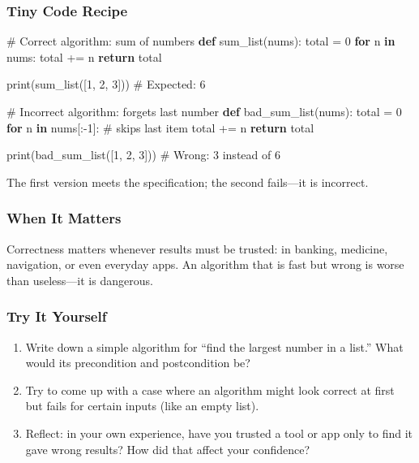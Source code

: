 \documentclass[
  letterpaper,
  DIV=11,
  numbers=noendperiod]{scrreprt}
\newenvironment{Shaded}{\begin{snugshade}}{\end{snugshade}}
\newcommand{\BuiltInTok}[1]{\textcolor[rgb]{0.00,0.23,0.31}{#1}}
\newcommand{\CommentTok}[1]{\textcolor[rgb]{0.37,0.37,0.37}{#1}}
\newcommand{\ControlFlowTok}[1]{\textcolor[rgb]{0.00,0.23,0.31}{\textbf{#1}}}
\newcommand{\DecValTok}[1]{\textcolor[rgb]{0.68,0.00,0.00}{#1}}
\newcommand{\KeywordTok}[1]{\textcolor[rgb]{0.00,0.23,0.31}{\textbf{#1}}}
\newcommand{\NormalTok}[1]{\textcolor[rgb]{0.00,0.23,0.31}{#1}}
\newcommand{\OperatorTok}[1]{\textcolor[rgb]{0.37,0.37,0.37}{#1}}
\providecommand{\tightlist}{%
  \setlength{\itemsep}{0pt}\setlength{\parskip}{0pt}}
\begin{document}
\subsubsection{Tiny Code Recipe}\label{tiny-code-recipe-58}

\begin{Shaded}
\begin{Highlighting}[]
\CommentTok{\# Correct algorithm: sum of numbers}
\KeywordTok{def}\NormalTok{ sum\_list(nums):}
\NormalTok{    total }\OperatorTok{=} \DecValTok{0}
    \ControlFlowTok{for}\NormalTok{ n }\KeywordTok{in}\NormalTok{ nums:}
\NormalTok{        total }\OperatorTok{+=}\NormalTok{ n}
    \ControlFlowTok{return}\NormalTok{ total}

\BuiltInTok{print}\NormalTok{(sum\_list([}\DecValTok{1}\NormalTok{, }\DecValTok{2}\NormalTok{, }\DecValTok{3}\NormalTok{]))  }\CommentTok{\# Expected: 6}

\CommentTok{\# Incorrect algorithm: forgets last number}
\KeywordTok{def}\NormalTok{ bad\_sum\_list(nums):}
\NormalTok{    total }\OperatorTok{=} \DecValTok{0}
    \ControlFlowTok{for}\NormalTok{ n }\KeywordTok{in}\NormalTok{ nums[:}\OperatorTok{{-}}\DecValTok{1}\NormalTok{]:  }\CommentTok{\# skips last item}
\NormalTok{        total }\OperatorTok{+=}\NormalTok{ n}
    \ControlFlowTok{return}\NormalTok{ total}

\BuiltInTok{print}\NormalTok{(bad\_sum\_list([}\DecValTok{1}\NormalTok{, }\DecValTok{2}\NormalTok{, }\DecValTok{3}\NormalTok{]))  }\CommentTok{\# Wrong: 3 instead of 6}
\end{Highlighting}
\end{Shaded}

The first version meets the specification; the second fails---it is
incorrect.

\subsubsection{When It Matters}\label{when-it-matters-58}

Correctness matters whenever results must be trusted: in banking,
medicine, navigation, or even everyday apps. An algorithm that is fast
but wrong is worse than useless---it is dangerous.

\subsubsection{Try It Yourself}\label{try-it-yourself-60}

\begin{enumerate}
\def\labelenumi{\arabic{enumi}.}
\tightlist
\item
  Write down a simple algorithm for ``find the largest number in a
  list.'' What would its precondition and postcondition be?
\item
  Try to come up with a case where an algorithm might look correct at
  first but fails for certain inputs (like an empty list).
\item
  Reflect: in your own experience, have you trusted a tool or app only
  to find it gave wrong results? How did that affect your confidence?
\end{enumerate}
\end{document}
